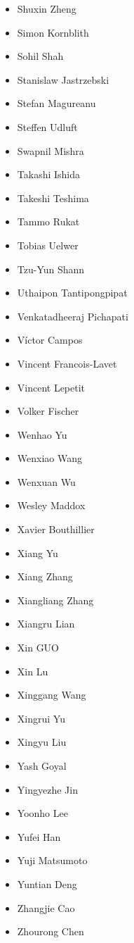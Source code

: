 \begin{multicols}{3}
\begin{itemize}[label={}]
    \item Shuxin Zheng
    \item Simon Kornblith
    \item Sohil Shah
    \item Stanislaw Jastrzebski
    \item Stefan Magureanu
    \item Steffen Udluft
    \item Swapnil Mishra
    \item Takashi Ishida
    \item Takeshi Teshima
    \item Tammo Rukat
    \item Tobias Uelwer
    \item Tzu-Yun Shann
    \item Uthaipon Tantipongpipat
    \item Venkatadheeraj Pichapati
    \item Víctor Campos
    \item Vincent Francois-Lavet
    \item Vincent Lepetit
    \item Volker Fischer
    \item Wenhao Yu
    \item Wenxiao Wang
    \item Wenxuan Wu
    \item Wesley Maddox
    \item Xavier Bouthillier
    \item Xiang Yu
    \item Xiang Zhang
    \item Xiangliang Zhang
    \item Xiangru Lian
    \item Xin GUO
    \item Xin Lu
    \item Xinggang Wang
    \item Xingrui Yu
    \item Xingyu Liu
    \item Yash Goyal
    \item Yingyezhe Jin
    \item Yoonho Lee
    \item Yufei Han
    \item Yuji Matsumoto
    \item Yuntian Deng
    \item Zhangjie Cao
    \item Zhourong Chen
\end{itemize}
\end{multicols}
